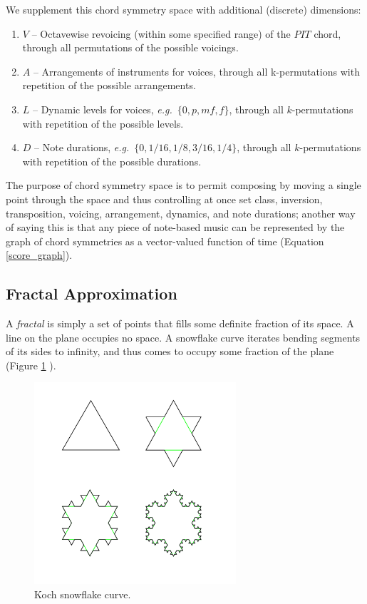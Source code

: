 \documentclass[english,11pt,letterpaper,onecolumn]{scrartcl}
\numberwithin{equation}{section}
\begin{document}
\noindent We supplement this chord symmetry space with additional (discrete)
dimensions:

\begin{enumerate}[resume]
\item $V$ -- Octavewise revoicing (within some specified range) of the $PIT$
chord, through all permutations of the possible voicings.
\item $A$ -- Arrangements of instruments for voices, through all
k-permutations with repetition of the possible arrangements.
\item $L$ -- Dynamic levels for voices, \emph{e.g.}\ $\{0, p, \mathit{mf}, f\}$, through
all $k$-permutations with repetition of the possible levels.
\item $D$ -- Note durations, \emph{e.g.}\ $\{0, 1/16, 1/8, 3/16, 1/4\}$, through all
$k$-permutations with repetition of the possible durations.
\end{enumerate}

\noindent The purpose of chord symmetry space is to permit composing by moving a
single point through the space and thus controlling at once set class,
inversion, transposition, voicing, arrangement, dynamics, and note durations;
another way of saying this is that any piece of note-based music can be
represented by the graph of chord symmetries as a vector-valued function of time
(Equation \eqref{score_graph}).

\subsection{Fractal Approximation}

A \textit{fractal} is simply a set of points that fills some definite fraction
of its space. A line on the plane occupies no space. A snowflake curve
iterates bending segments of its sides to infinity, and thus comes to occupy
some fraction of the plane (Figure \ref{fig:kochflake}
\cite{Mandelbrot:1982:FGN}).

\begin{figure}
\centerline{\includegraphics[width = 0.6667\textwidth]{KochFlake}}
\caption{\label{fig:kochflake} Koch snowflake
curve.\protect\footnotemark}
\end{figure}
\end{document}
